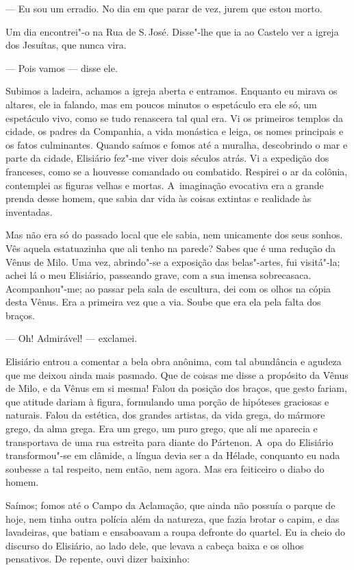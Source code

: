 \begin{linenumbers}
--- Eu sou um erradio. No dia em que parar de vez, jurem que estou morto.

Um dia encontrei"-o na Rua de S.\,José. Disse"-lhe que ia ao Castelo ver a
igreja dos Jesuítas, que nunca vira.

--- Pois vamos --- disse ele.

Subimos a ladeira, achamos a igreja aberta e entramos. Enquanto eu
mirava os altares, ele ia falando, mas em poucos minutos o espetáculo
era ele só, um espetáculo vivo, como se tudo renascera tal qual era. Vi
os primeiros templos da cidade, os padres da Companhia, a vida monástica
e leiga, os nomes principais e os fatos culminantes. Quando saímos e
fomos até a muralha, descobrindo o mar e parte da cidade, Elisiário
fez"-me viver dois séculos atrás. Vi a expedição dos franceses, como se a
houvesse comandado ou combatido. Respirei o ar da colônia, contemplei as
figuras velhas e mortas. A~imaginação evocativa era a grande prenda
desse homem, que sabia dar vida às coisas extintas e realidade às
inventadas.

Mas não era só do passado local que ele sabia, nem unicamente dos seus
sonhos. Vês aquela estatuazinha que ali tenho na parede? Sabes que é uma
redução da Vênus de Milo. Uma vez, abrindo"-se a exposição das
belas"-artes, fui visitá"-la; achei lá o meu Elisiário, passeando grave,
com a sua imensa sobrecasaca. Acompanhou"-me; ao passar pela sala de
escultura, dei com os olhos na cópia desta Vênus. Era a primeira vez que
a via. Soube que era ela pela falta dos braços.

--- Oh! Admirável! --- exclamei.

Elisiário entrou a comentar a bela obra anônima, com tal abundância e
agudeza que me deixou ainda mais pasmado. Que de coisas me disse a
propósito da Vênus de Milo, e da Vênus em si mesma! Falou da posição dos
braços, que gesto fariam, que atitude dariam à figura, formulando uma
porção de hipóteses graciosas e naturais. Falou da estética, dos grandes
artistas, da vida grega, do mármore grego, da alma grega. Era um grego,
um puro grego, que ali me aparecia e transportava de uma rua estreita
para diante do Pártenon. A~opa do Elisiário transformou"-se em clâmide, a
língua devia ser a da Hélade, conquanto eu nada soubesse a tal respeito,
nem então, nem agora. Mas era feiticeiro o diabo do homem.

Saímos; fomos até o Campo da Aclamação, que ainda não possuía o parque
de hoje, nem tinha outra polícia além da natureza, que fazia brotar o
capim, e das lavadeiras, que batiam e ensaboavam a roupa defronte do
quartel. Eu ia cheio do discurso do Elisiário, ao lado dele, que levava
a cabeça baixa e os olhos pensativos. De repente, ouvi dizer baixinho:


\end{linenumbers}
